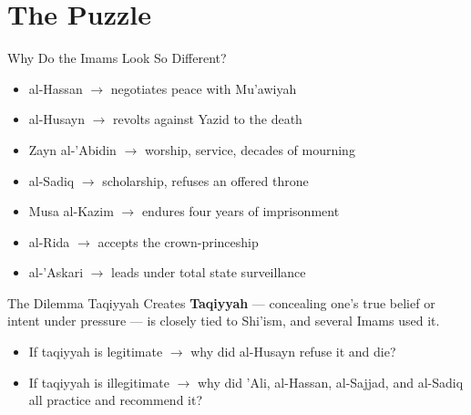 \section{The Puzzle}

\begin{frame}{Why Do the Imams Look So Different?}
\begin{itemize}[itemsep=4pt]
  \item al-Hassan $\rightarrow$ negotiates peace with Mu'awiyah
  \item al-Husayn $\rightarrow$ revolts against Yazid to the death
  \item Zayn al-'Abidin $\rightarrow$ worship, service, decades of mourning
  \item al-Sadiq $\rightarrow$ scholarship, refuses an offered throne
  \item Musa al-Kazim $\rightarrow$ endures four years of imprisonment
  \item al-Rida $\rightarrow$ accepts the crown-princeship
  \item al-'Askari $\rightarrow$ leads under total state surveillance
\end{itemize}
\end{frame}

\begin{frame}{The Dilemma Taqiyyah Creates}
\textbf{Taqiyyah} --- concealing one's true belief or intent under pressure --- is closely tied to Shi'ism, and several Imams used it.
\begin{itemize}[itemsep=4pt]
  \item If taqiyyah is legitimate $\rightarrow$ why did al-Husayn refuse it and die?
  \item If taqiyyah is illegitimate $\rightarrow$ why did 'Ali, al-Hassan, al-Sajjad, and al-Sadiq all practice and recommend it?
\end{itemize}
\end{frame}

